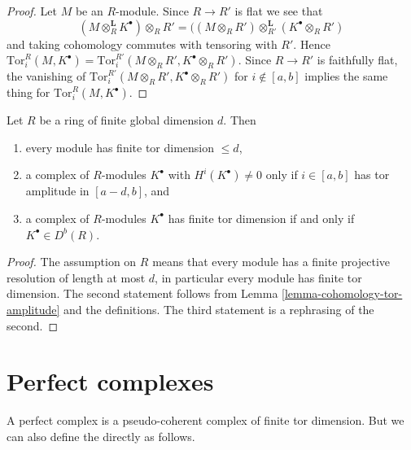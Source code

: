 \begin{proof}
Let $M$ be an $R$-module. Since $R \to R'$ is flat we see that
$$
(M \otimes_R^{\mathbf{L}} K^\bullet) \otimes_R R'
=
((M \otimes_R R') \otimes_{R'}^{\mathbf{L}} (K^\bullet \otimes_R R')
$$
and taking cohomology commutes with tensoring with $R'$.
Hence $\text{Tor}_i^R(M, K^\bullet) =
\text{Tor}_i^{R'}(M \otimes_R R', K^\bullet \otimes_R R')$.
Since $R \to R'$ is faithfully flat, the vanishing of
$\text{Tor}_i^{R'}(M \otimes_R R', K^\bullet \otimes_R R')$ for
$i \not \in [a, b]$ implies the same thing for
$\text{Tor}_i^R(M, K^\bullet)$.
\end{proof}

\begin{lemma}
\label{lemma-finite-gl-dim-tor-dimension}
Let $R$ be a ring of finite global dimension $d$. Then
\begin{enumerate}
\item every module has finite tor dimension $\leq d$,
\item a complex of $R$-modules $K^\bullet$ with $H^i(K^\bullet) \not = 0$
only if $i \in [a, b]$ has tor amplitude in $[a - d, b]$, and
\item a complex of $R$-modules $K^\bullet$ has finite tor dimension if and only
if $K^\bullet \in D^b(R)$.
\end{enumerate}
\end{lemma}

\begin{proof}
The assumption on $R$ means that every module has a finite projective
resolution of length at most $d$, in particular every module has finite
tor dimension. The second statement follows from
Lemma \ref{lemma-cohomology-tor-amplitude}
and the definitions. The third statement is a rephrasing of the second.
\end{proof}















\section{Perfect complexes}
\label{section-perfect}

\noindent
A perfect complex is a pseudo-coherent complex of finite tor dimension.
But we can also define the directly as follows.

